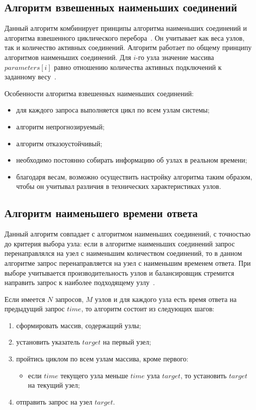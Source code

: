 \subsection*{Алгоритм взвешенных наименьших соединений}

Данный алгоритм комбинирует принципы алгоритма наименьших соединений и алгоритма взвешенного циклического перебора~\cite{part_algos}.
Он учитывает как веса узлов, так и количество активных соединений. 
Алгоритм работает по общему принципу алгоритмов наименьших соединений. Для $i$-го узла значение массива $parameters[i]$ равно отношению количества активных подключений к заданному весу~\cite{mainsource}.

Особенности алгоритма взвешенных наименьших соединений:
\begin{itemize}
    \item для каждого запроса выполняется цикл по всем узлам системы;
	\item алгоритм непрогнозируемый; 
	\item алгоритм отказоустойчивый;
	\item необходимо постоянно собирать информацию об узлах в реальном времени;
	\item благодаря весам, возможно осуществить настройку алгоритма таким образом, чтобы он учитывал различия в технических характеристиках узлов.
\end{itemize}


\subsection{Алгоритм наименьшего времени ответа}

Данный алгоритм совпадает с алгоритмом наименьших соединений, с точностью до критерия выбора узла: если в алгоритме наименьших соединений запрос перенаправлялся на узел с наименьшим количеством соединений, то в данном алгоритме запрос перенаправляется на узел с наименьшим временем ответа.
При выборе учитывается производительность узлов и балансировщик стремится направить запрос к наиболее подходящему узлу~\cite{aws}.

Если имеется $N$ запросов, $M$ узлов и для каждого узла есть время ответа на предыдущий запрос $time$, то алгоритм состоит из следующих шагов:

\begin{enumerate}
	\item сформировать массив, содержащий узлы;
	\item установить указатель $target$ на первый узел;
	\item пройтись циклом по всем узлам массива, кроме первого:
	\begin{itemize}
		\item если $time$ текущего узла меньше $time$ узла $target$, то установить $target$ на текущий узел; 
	\end{itemize}
	\item отправить запрос на узел $target$.
\end{enumerate}

